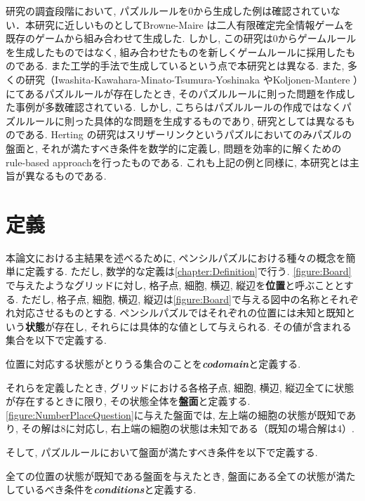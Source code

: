 研究の調査段階において, パズルルールを0から生成した例は確認されていない．本研究に近しいものとしてBrowne-Maire \cite{Browne2010}は二人有限確定完全情報ゲームを既存のゲームから組み合わせて生成した. しかし, この研究は0からゲームルールを生成したものではなく, 組み合わせたものを新しくゲームルールに採用したものである. また工学的手法で生成しているという点で本研究とは異なる. また, 多くの研究（Iwashita-Kawahara-Minato-Tsumura-Yoshinaka
\cite{Yoshinaka2012}やKoljonen-Mantere \cite{Mantere2007}）にてあるパズルルールが存在したとき, そのパズルルールに則った問題を作成した事例が多数確認されている. しかし, こちらはパズルルールの作成ではなくパズルルールに則った具体的な問題を生成するものであり, 研究としては異なるものである. Herting	 \cite{Herting2004}の研究はスリザーリンクというパズルにおいてのみパズルの盤面と, それが満たすべき条件を数学的に定義し, 問題を効率的に解くためのrule-based approachを行ったものである. これも上記の例と同様に, 本研究とは主旨が異なるものである.



\section{定義}\label{section:IntroDefinition}
本論文における主結果を述べるために, ペンシルパズルにおける種々の概念を簡単に定義する. ただし, 数学的な定義は\cref{chapter:Definition}で行う. \cref{figure:Board}で与えたようなグリッドに対し, 格子点, 細胞, 横辺, 縦辺を\textbf{位置}と呼ぶこととする. ただし, 格子点, 細胞, 横辺, 縦辺は\cref{figure:Board}で与える図中の名称とそれぞれ対応させるものとする. ペンシルパズルではそれぞれの位置には未知と既知という\textbf{状態}が存在し, それらには具体的な値として与えられる. その値が含まれる集合を以下で定義する.
\begin{definition}
  位置に対応する状態がとりうる集合のことを\textbf{\textit{codomain}}と定義する.
\end{definition}
それらを定義したとき, グリッドにおける各格子点, 細胞, 横辺, 縦辺全てに状態が存在するときに限り, その状態全体を\textbf{盤面}と定義する. \cref{figure:NumberPlaceQuestion}に与えた盤面では, 左上端の細胞の状態が既知であり, その解は8に対応し, 右上端の細胞の状態は未知である（既知の場合解は4）.

そして, パズルルールにおいて盤面が満たすべき条件を以下で定義する.
\begin{definition}
  全ての位置の状態が既知である盤面を与えたとき, 盤面にある全ての状態が満たしているべき条件を\textbf{\textit{conditions}}と定義する.
\end{definition}

